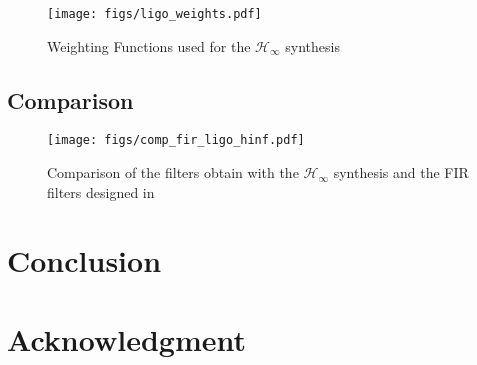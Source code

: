 \documentclass[9pt, technote, a4paper]{ieeeconf}
\begin{document}
\begin{figure}[htbp]
\centering
\texttt{[image: figs/ligo\_weights.pdf]}
\caption{\label{fig:ligo_weights}
Weighting Functions used for the \(\mathcal{H}_\infty\) synthesis}
\end{figure}

\subsection{Comparison}
\label{sec:org06ff1a1}
\label{sec:ligo_results}

\begin{figure}[htbp]
\centering
\texttt{[image: figs/comp\_fir\_ligo\_hinf.pdf]}
\caption{\label{fig:comp_fir_ligo_hinf}
Comparison of the filters obtain with the \(\mathcal{H}_\infty\) synthesis and the FIR filters designed in \cite{hua05_low_ligo}}
\end{figure}

\section{Conclusion}
\label{sec:orga86d375}
\label{sec:conclusion}

\section{Acknowledgment}
\label{sec:org8d338b6}


\end{document}
